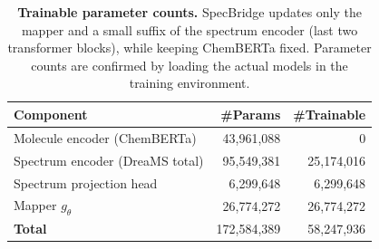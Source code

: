 \begin{table}[t]
\centering
\small
\setlength{\tabcolsep}{6pt}
\renewcommand{\arraystretch}{1.15}
\begin{tabular}{lrr}
\toprule
\textbf{Component} & \textbf{\#Params} & \textbf{\#Trainable} \\
\midrule
Molecule encoder (ChemBERTa) & 43,961,088 & 0 \\
Spectrum encoder (DreaMS total) & 95,549,381 & 25,174,016 \\
Spectrum projection head & 6,299,648 & 6,299,648 \\
Mapper $g_\theta$ & 26,774,272 & 26,774,272 \\
\midrule
\textbf{Total} & 172,584,389 & 58,247,936 \\
\bottomrule
\end{tabular}
\caption{\textbf{Trainable parameter counts.}
SpecBridge updates only the mapper and a small suffix of the spectrum encoder (last two transformer blocks), while keeping ChemBERTa fixed.
Parameter counts are confirmed by loading the actual models in the training environment.}
\label{tab:param_breakdown}
\end{table}

